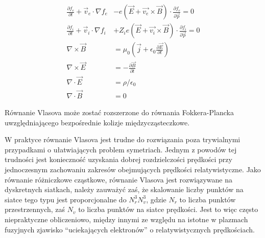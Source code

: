     \begin{align}
    \frac{\partial f_e}{\partial t} + \vec {v}_e\cdot\nabla f_e &- e\left(\vec {E}+\vec {v_e}\times\vec {B}\right)\cdot\frac{\partial f_e}{\partial\vec {p}} = 0
    \label{eqn:vlasov-electrons}\\
    \frac{\partial f_i}{\partial t} + \vec {v}_i\cdot\nabla f_i &+ Z_i e\left(\vec {E}+\vec {v_i}\times\vec {B}\right)\cdot\frac{\partial f_i}{\partial\vec {p}} = 0
    \label{eqn:vlasov-ions}\\
    \nabla \times \vec{B} &=\mu_0 \left(\vec{j}+\epsilon_0 \frac{\partial \vec{E} }{\partial t}\right)
    \label{eqn:maxwell-B-rotation}\\
    \nabla\times\vec {E} &=-\frac{\partial\vec {B}}{\partial t}
    \label{eqn:maxwell-E-rotation}\\
    \nabla\cdot\vec {E}  &=\rho / \epsilon_0
    \label{eqn:maxwell-E-div}\\
    \nabla\cdot\vec {B}  &=0
    \label{eqn:maxwell-B-div}
    \end{align}

    Równanie Vlasova może zostać rozszerzone do równania Fokkera-Plancka uwzględniającego
    bezpośrednie kolizje międzycząsteczkowe.

    W praktyce równanie Vlasova jest trudne do rozwiązania poza trywialnymi
    przypadkami o ułatwiających problem symetriach.  Jednym z powodów tej
    trudności jest konieczność uzyskania dobrej rozdzielczości prędkości przy
    jednoczesnym zachowaniu zakresów obejmujących prędkości relatywistyczne.
    Jako równanie różniczkowe cząstkowe, równanie Vlasova jest rozwiązywane na
    dyskretnych siatkach, należy zauważyć zaś, że skalowanie
    liczby punktów na siatce tego typu jest proporcjonalne do $N_r^3 N_v^3$,
    gdzie $N_r$ to liczba punktów przestrzennych, zaś $N_v$ to liczba punktów
    na siatce prędkości. Jest to więc często niepraktyczne obliczeniowo,
    między innymi ze względu na istotne w plazmach fuzyjnych zjawisko
    ``uciekających elektronów'' o relatywistycznych prędkościach.

